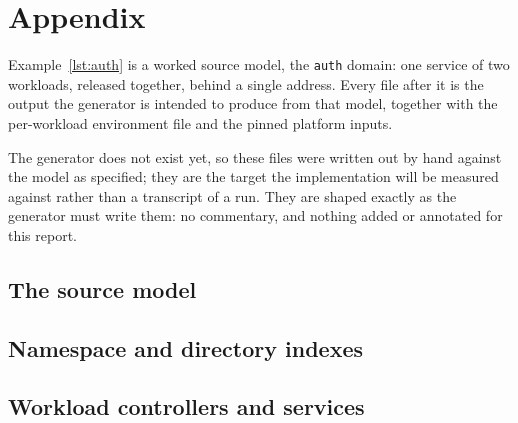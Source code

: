 \clearpage
\appendix

\section{Appendix}
\label{app:rendered}

Example~\ref{lst:auth} is a worked source model, the \texttt{auth} domain: one
service of two workloads, released together, behind a single address. Every file
after it is the output the generator is intended to produce from that model,
together with the per-workload environment file and the pinned platform inputs.

The generator does not exist yet, so these files were written out by hand
against the model as specified; they are the target the implementation will be
measured against rather than a transcript of a run. They are shaped exactly as
the generator must write them: no commentary, and nothing added or annotated for
this report.

\subsection{The source model}



\subsection{Namespace and directory indexes}





\subsection{Workload controllers and services}





